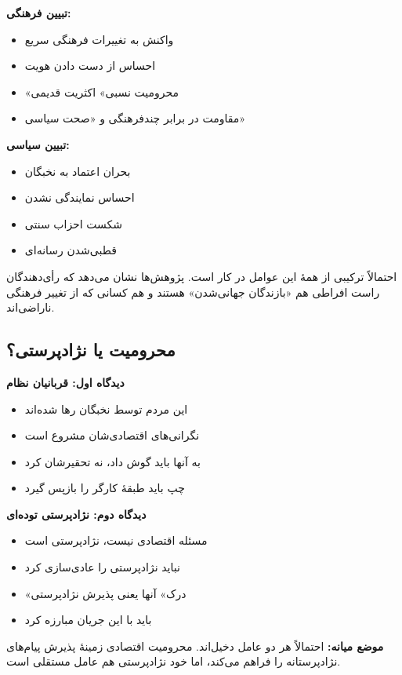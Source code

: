 \textbf{تبیین فرهنگی:}
\begin{itemize}
    \item واکنش به تغییرات فرهنگی سریع
    \item احساس از دست دادن هویت
    \item «محرومیت نسبی» اکثریت قدیمی
    \item مقاومت در برابر چندفرهنگی و «صحت سیاسی»
\end{itemize}

\textbf{تبیین سیاسی:}
\begin{itemize}
    \item بحران اعتماد به نخبگان
    \item احساس نمایندگی نشدن
    \item شکست احزاب سنتی
    \item قطبی‌شدن رسانه‌ای
\end{itemize}

احتمالاً ترکیبی از همهٔ این عوامل در کار است. پژوهش‌ها نشان می‌دهد که رأی‌دهندگان راست افراطی هم «بازندگان جهانی‌شدن» هستند و هم کسانی که از تغییر فرهنگی ناراضی‌اند.


\subsection{محرومیت یا نژادپرستی؟}

\begin{tcolorbox}[
    enhanced,
    colback=leftred!8,
    colframe=leftred,
    boxrule=1.5pt,
    arc=5pt,
    fonttitle=\bfseries,
    title={\rl{🔴 مناظره: رأی‌دهندگان راست افراطی}}
]

\textbf{دیدگاه اول: قربانیان نظام}
\begin{itemize}
    \item این مردم توسط نخبگان رها شده‌اند
    \item نگرانی‌های اقتصادی‌شان مشروع است
    \item به آنها باید گوش داد، نه تحقیرشان کرد
    \item چپ باید طبقهٔ کارگر را بازپس گیرد
\end{itemize}



\textbf{دیدگاه دوم: نژادپرستی توده‌ای}
\begin{itemize}
    \item مسئله اقتصادی نیست، نژادپرستی است
    \item نباید نژادپرستی را عادی‌سازی کرد
    \item «درک» آنها یعنی پذیرش نژادپرستی
    \item باید با این جریان مبارزه کرد
\end{itemize}


\vspace{3mm}
\textbf{موضع میانه:} احتمالاً هر دو عامل دخیل‌اند. محرومیت اقتصادی زمینهٔ پذیرش پیام‌های نژادپرستانه را فراهم می‌کند، اما خود نژادپرستی هم عامل مستقلی است.
\end{tcolorbox}

